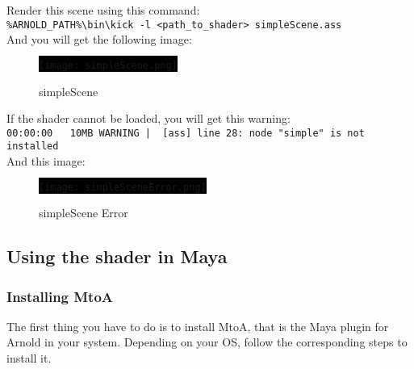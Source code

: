 \inputminted[mathescape,
linenos,
numbersep=5pt,
frame=lines,
framesep=2mm,
baselinestretch=1,
fontsize=\footnotesize,
tabsize=3,
label=simpleScene.ass]
{ass}{simpleScene.ass}

Render this scene using this command:\\
\verb|%ARNOLD_PATH%\bin\kick -l <path_to_shader> simpleScene.ass|\\

And you will get the following image:
\begin{figure}[H]
\centering
\colorbox{black}{\texttt{[image: simpleScene.png]}}
\caption{simpleScene}
\label{simpleScene.png}
\end{figure}

If the shader cannot be loaded, you will get this warning:\\
{\footnotesize \verb=00:00:00   10MB WARNING |  [ass] line 28: node "simple" is not installed=}\\
And this image:
\begin{figure}[H]
\centering
\colorbox{black}{\texttt{[image: simpleSceneError.png]}}
\caption{simpleScene Error}
\label{simpleSceneError.png}
\end{figure}

\subsection{Using the shader in Maya}
\subsubsection{Installing MtoA}
The first thing you have to do is to install MtoA, that is the Maya plugin for Arnold in your system. Depending on your OS, follow the corresponding steps to install it.


